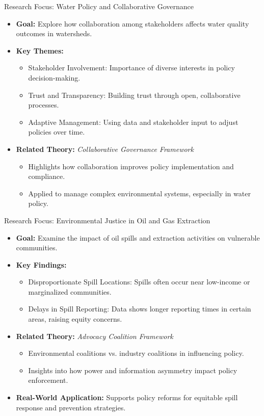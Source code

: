 \documentclass[11pt, aspectratio=169]{beamer}
\begin{document}
\begin{frame}{Research Focus: Water Policy and Collaborative Governance}
    \begin{itemize}
        \item \textbf{Goal:} Explore how collaboration among stakeholders affects water quality outcomes in watersheds.
        \item \textbf{Key Themes:}
            \begin{itemize}
                \item Stakeholder Involvement: Importance of diverse interests in policy decision-making.
                \item Trust and Transparency: Building trust through open, collaborative processes.
                \item Adaptive Management: Using data and stakeholder input to adjust policies over time.
            \end{itemize}
        \item \textbf{Related Theory:} \textit{Collaborative Governance Framework}
            \begin{itemize}
                \item Highlights how collaboration improves policy implementation and compliance.
                \item Applied to manage complex environmental systems, especially in water policy.
            \end{itemize}
    \end{itemize}
\end{frame}

\begin{frame}{Research Focus: Environmental Justice in Oil and Gas Extraction}
    \begin{itemize}
        \item \textbf{Goal:} Examine the impact of oil spills and extraction activities on vulnerable communities.
        \item \textbf{Key Findings:}
            \begin{itemize}
                \item Disproportionate Spill Locations: Spills often occur near low-income or marginalized communities.
                \item Delays in Spill Reporting: Data shows longer reporting times in certain areas, raising equity concerns.
            \end{itemize}
        \item \textbf{Related Theory:} \textit{Advocacy Coalition Framework}
            \begin{itemize}
                \item Environmental coalitions vs. industry coalitions in influencing policy.
                \item Insights into how power and information asymmetry impact policy enforcement.
            \end{itemize}
        \item \textbf{Real-World Application:} Supports policy reforms for equitable spill response and prevention strategies.
    \end{itemize}
\end{frame}
\end{document}
